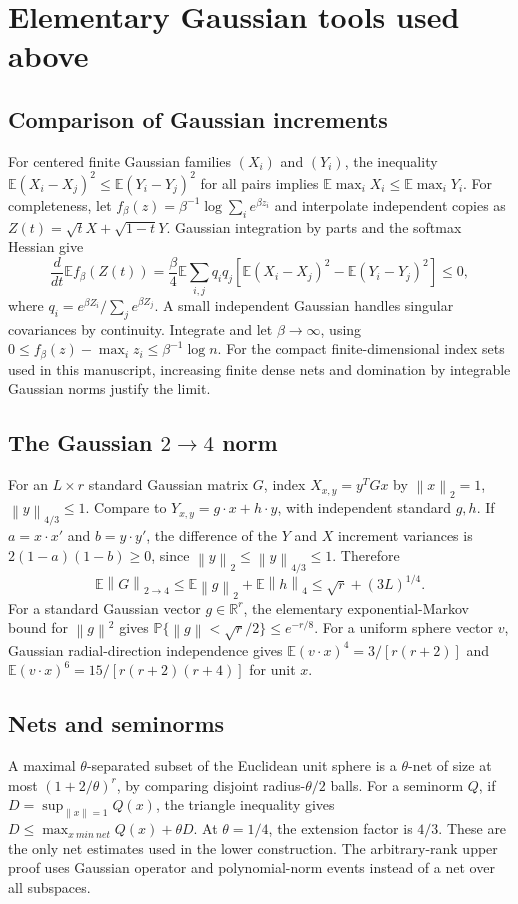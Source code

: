 \documentclass[11pt]{article}
\theoremstyle{remark}\newtheorem{remark}[theorem]{Remark}
\newcommand{\R}{\mathbb R}\newcommand{\E}{\mathbb E}\newcommand{\Prob}{\mathbb P}
\newcommand{\norm}[1]{\left\lVert#1\right\rVert}\newcommand{\abs}[1]{\left|#1\right|}
\numberwithin{equation}{section}
\begin{document}
\appendix
\section{Elementary Gaussian tools used above}\label{app:gaussian}
\subsection{Comparison of Gaussian increments}
For centered finite Gaussian families $(X_i)$ and $(Y_i)$, the inequality
$\E(X_i-X_j)^2\le\E(Y_i-Y_j)^2$ for all pairs implies
$\E\max_i X_i\le\E\max_i Y_i$.
For completeness, let $f_\beta(z)=\beta^{-1}\log\sum_i e^{\beta z_i}$ and interpolate independent copies as $Z(t)=\sqrt t X+\sqrt{1-t}Y$. Gaussian integration by parts and the softmax Hessian give
\[
 \frac d{dt}\E f_\beta(Z(t))
 =\frac\beta4\E\sum_{i,j}q_iq_j
 \left[\E(X_i-X_j)^2-\E(Y_i-Y_j)^2\right]\le0,
\]
where $q_i=e^{\beta Z_i}/\sum_j e^{\beta Z_j}$. A small independent Gaussian handles singular covariances by continuity. Integrate and let $\beta\to\infty$, using
$0\le f_\beta(z)-\max_i z_i\le\beta^{-1}\log n$.
For the compact finite-dimensional index sets used in this manuscript, increasing finite dense nets and domination by integrable Gaussian norms justify the limit.

\subsection{\texorpdfstring{The Gaussian $2\to4$ norm}{The Gaussian 2-to-4 norm}}
For an $L\times r$ standard Gaussian matrix $G$, index $X_{x,y}=y^TGx$ by $\norm x_2=1$, $\norm y_{4/3}\le1$. Compare to $Y_{x,y}=g\cdot x+h\cdot y$, with independent standard $g,h$. If $a=x\cdot x'$ and $b=y\cdot y'$, the difference of the $Y$ and $X$ increment variances is $2(1-a)(1-b)\ge0$, since $\norm y_2\le\norm y_{4/3}\le1$. Therefore
\[
 \E\norm G_{2\to4}\le\E\norm g_2+\E\norm h_4
 \le\sqrt r+(3L)^{1/4}.
\]
For a standard Gaussian vector $g\in\R^r$, the elementary exponential-Markov bound for $\norm g^2$ gives
$\Prob\{\norm g<\sqrt r/2\}\le e^{-r/8}$. For a uniform sphere vector $v$, Gaussian radial-direction independence gives
$\E(v\cdot x)^4=3/[r(r+2)]$ and
$\E(v\cdot x)^6=15/[r(r+2)(r+4)]$ for unit $x$.

\subsection{Nets and seminorms}
A maximal $\theta$-separated subset of the Euclidean unit sphere is a $\theta$-net of size at most $(1+2/\theta)^r$, by comparing disjoint radius-$\theta/2$ balls. For a seminorm $Q$, if $D=\sup_{\norm x=1}Q(x)$, the triangle inequality gives
$D\le\max_{x\ {
m in\ net}}Q(x)+\theta D$.
At $\theta=1/4$, the extension factor is $4/3$. These are the only net estimates used in the lower construction. The arbitrary-rank upper proof uses Gaussian operator and polynomial-norm events instead of a net over all subspaces.
\end{document}
